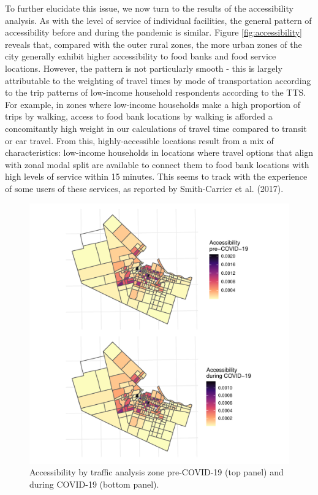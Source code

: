 \documentclass[]{elsarticle} %
\begin{document}
To further elucidate this issue, we now turn to the results of the
accessibility analysis. As with the level of service of individual
facilities, the general pattern of accessibility before and during the
pandemic is similar. Figure \ref{fig:accessibility} reveals that,
compared with the outer rural zones, the more urban zones of the city
generally exhibit higher accessibility to food banks and food service
locations. However, the pattern is not particularly smooth - this is
largely attributable to the weighting of travel times by mode of
transportation according to the trip patterns of low-income household
respondents according to the TTS. For example, in zones where low-income
households make a high proportion of trips by walking, access to food
bank locations by walking is afforded a concomitantly high weight in our
calculations of travel time compared to transit or car travel. From
this, highly-accessible locations result from a mix of characteristics:
low-income households in locations where travel options that align with
zonal modal split are available to connect them to food bank locations
with high levels of service within 15 minutes. This seems to track with
the experience of some users of these services, as reported by
Smith-Carrier et al. (2017).

\begin{figure}

{\centering \includegraphics[width=1\linewidth]{Accessibility-Foodbanks-Hamilton_files/figure-latex/plot-accessibility-1} 

}

\caption{\label{fig:accessibility}Accessibility by traffic analysis zone pre-COVID-19 (top panel) and during COVID-19 (bottom panel).}\label{fig:plot-accessibility}
\end{figure}
\end{document}
